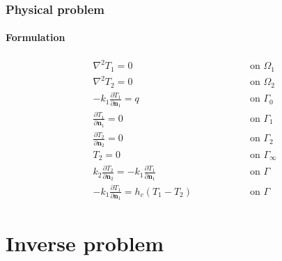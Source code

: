 \documentclass[aspectratio=169]{beamer}
\begin{document}
%
\begin{frame}
	\frametitle{Physical problem}
	\framesubtitle{Formulation}
	\begin{subequations}
		\begin{alignat*}{2}
		& \nabla^2 T_1 = 0 \quad\quad\quad\quad && \text{ on } \Omega_1  \\ 
		& \nabla^2 T_2 = 0 && \text{ on }  \Omega_2\\ 
		& -k_1 \frac{\partial T_1}{\partial\mathbf{n}_1} = q && \text{ on } \Gamma_0   \\ 
		& \frac{\partial T_1}{\partial \mathbf{n}_1} = 0 && \text{ on }  \Gamma_1 \\ 
		& \frac{\partial T_2}{\partial \mathbf{n}_2} = 0 && \text{ on }  \Gamma_2 \\
		& T_2 = 0 && \text{ on }  \Gamma_\infty  \\ 
		& k_2\frac{\partial T_2}{\partial\mathbf{n}_2} = - k_1\frac{\partial T_1}{\partial\mathbf{n}_1} && \text{ on }  \Gamma \\
		& -k_1 \frac{\partial T_1}{\partial\mathbf{n}_1} = h_c(T_1-T_2) \quad\quad\quad\quad && \text{ on }  \Gamma
		\end{alignat*}
	\end{subequations}
\end{frame}
%
\section{Inverse problem}
\end{document}
